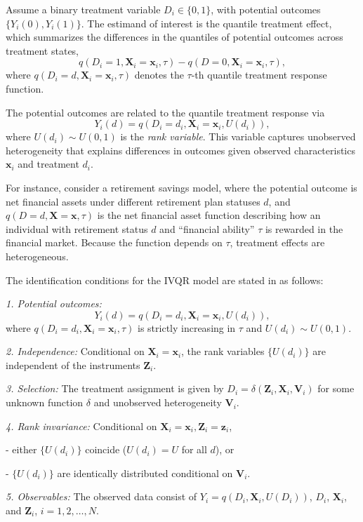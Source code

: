 Assume a binary treatment variable $D_i\in\{0,1\}$, with potential outcomes $\{Y_i(0),Y_i(1)\}$. The estimand of interest is the quantile treatment effect, which summarizes the differences in the quantiles of potential outcomes across treatment states,
\[
q(D_i=1,\mathbf{X}_i=\mathbf{x}_i,\tau)-q(D=0,\mathbf{X}_i=\mathbf{x}_i,\tau),
\] 
where $q(D_i=d,\mathbf{X}_i=\mathbf{x}_i,\tau)$ denotes the $\tau$-th quantile treatment response function.  

The potential outcomes are related to the quantile treatment response via
\[
Y_i(d)=q(D_i=d_i,\mathbf{X}_i=\mathbf{x}_i,U(d_i)),
\]
where $U(d_i)\sim U(0,1)$ is the \textit{rank variable}. This variable captures unobserved heterogeneity that explains differences in outcomes given observed characteristics $\mathbf{x}_i$ and treatment $d_i$.  

For instance, consider a retirement savings model, where the potential outcome is net financial assets under different retirement plan statuses $d$, and $q(D=d,\mathbf{X}=\mathbf{x},\tau)$ is the net financial asset function describing how an individual with retirement status $d$ and ``financial ability'' $\tau$ is rewarded in the financial market. Because the function depends on $\tau$, treatment effects are heterogeneous.  

The identification conditions for the IVQR model are stated in \cite{Chernozhukov2005} as follows:

\textit{1. Potential outcomes:}  
\[
Y_i(d)=q(D_i=d_i,\mathbf{X}_i=\mathbf{x}_i,U(d_i)),
\]
where $q(D_i=d_i,\mathbf{X}_i=\mathbf{x}_i,\tau)$ is strictly increasing in $\tau$ and $U(d_i)\sim U(0,1)$.  

\textit{2. Independence:} Conditional on $\mathbf{X}_i=\mathbf{x}_i$, the rank variables $\{U(d_i)\}$ are independent of the instruments $\mathbf{Z}_i$.  

\textit{3. Selection:} The treatment assignment is given by $D_i=\delta(\mathbf{Z}_i,\mathbf{X}_i,\mathbf{V}_i)$ for some unknown function $\delta$ and unobserved heterogeneity $\mathbf{V}_i$.  

\textit{4. Rank invariance:} Conditional on $\mathbf{X}_i=\mathbf{x}_i,\mathbf{Z}_i=\mathbf{z}_i$,

- either $\{U(d_i)\}$ coincide ($U(d_i)=U$ for all $d$), or
  
- $\{U(d_i)\}$ are identically distributed conditional on $\mathbf{V}_i$.  

\textit{5. Observables:} The observed data consist of $Y_i=q(D_i,\mathbf{X}_i,U(D_i))$, $D_i$, $\mathbf{X}_i$, and $\mathbf{Z}_i$, $i=1,2,\dots,N$.  

